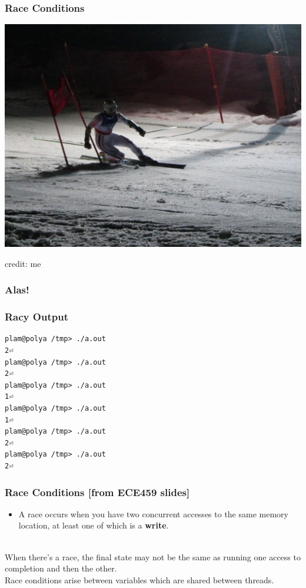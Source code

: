 \documentclass{beamer}
\newenvironment{changemargin}[1]{%
  \begin{list}{}{%
    \setlength{\topsep}{0pt}%
    \setlength{\leftmargin}{#1}%
    \setlength{\rightmargin}{1em}
    \setlength{\listparindent}{\parindent}%
    \setlength{\itemindent}{\parindent}%
    \setlength{\parsep}{\parskip}%
  }%
  \item[]}{\end{list}}
\begin{document}
\begin{frame}
  \frametitle{Race Conditions}
  \begin{center}
    \includegraphics[width=.8\textwidth]{L10/5482_racer}
    
    \hfill credit: me
  \end{center}
\end{frame}

\begin{frame}
  \frametitle{Alas!}
  \scriptsize
  \begin{changemargin}{2cm}
    
  \end{changemargin}
\end{frame}

\begin{frame}[fragile]
  \frametitle{Racy Output}
  \begin{changemargin}{2cm}
\begin{verbatim}
plam@polya /tmp> ./a.out
2⏎
plam@polya /tmp> ./a.out
2⏎
plam@polya /tmp> ./a.out
1⏎
plam@polya /tmp> ./a.out
1⏎
plam@polya /tmp> ./a.out
2⏎
plam@polya /tmp> ./a.out
2⏎
\end{verbatim}
  \end{changemargin}
\end{frame}

\begin{frame}
  \frametitle{Race Conditions [from ECE459 slides]}

  \begin{changemargin}{2.5cm}
  \begin{itemize}
    \item A race occurs when you have two concurrent accesses to the
      same memory location, at least one of which is a {\bf write}.
  \end{itemize}~\\

   When there's a race, the final state may not be the same as
      running one access to completion and then the other.\\[1em]
   Race conditions arise between variables which
      are shared between threads.
  \end{changemargin}

\end{frame}
\end{document}
